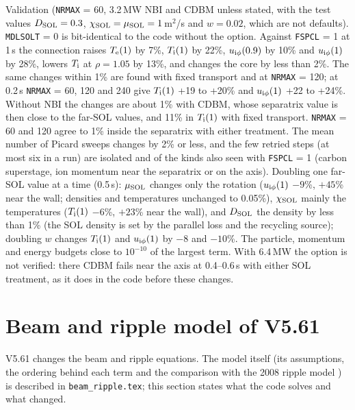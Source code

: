 \documentclass[11pt]{article}
\def\r#1{{\rm#1}}
\begin{document}
Validation (\texttt{NRMAX} = 60, 3.2\,MW NBI and CDBM unless stated, with the test values
$D_\r{SOL}=0.3$, $\chi_\r{SOL}=\mu_\r{SOL}=1$\,m$^2$/s and $w=0.02$, which are not defaults).
\texttt{MDLSOLT} = 0 is bit-identical to the code without the option.  Against
\texttt{FSPCL} = 1 at 1\,s the connection raises $T_\r{e}(1)$ by 7\%, $T_\r{i}(1)$ by 22\%,
$u_{\r{i}\phi}(0.9)$ by 10\% and $u_{\r{i}\phi}(1)$ by 28\%, lowers $T_\r{i}$ at $\rho=1.05$ by
13\%, and changes the core by less than 2\%.  The same changes within 1\% are found with fixed
transport and at \texttt{NRMAX} = 120; at 0.2\,s \texttt{NRMAX} = 60, 120 and 240 give $T_\r{i}(1)$
+19 to +20\% and $u_{\r{i}\phi}(1)$ +22 to +24\%.  Without NBI the changes are about 1\% with
CDBM, whose separatrix value is then close to the far-SOL values, and 11\% in $T_\r{i}(1)$ with
fixed transport.  \texttt{NRMAX} = 60 and 120 agree to 1\% inside the separatrix with either
treatment.  The mean number of Picard sweeps changes by 2\% or less, and the few retried steps
(at most six in a run) are isolated and of the kinds also seen with \texttt{FSPCL} = 1 (carbon
superstage, ion momentum near the separatrix or on the axis).  Doubling one
far-SOL value at a time (0.5\,s): $\mu_\r{SOL}$ changes only the rotation ($u_{\r{i}\phi}(1)$
$-9$\%, $+45$\% near the wall; densities and temperatures unchanged to 0.05\%), $\chi_\r{SOL}$
mainly the temperatures ($T_\r{i}(1)$ $-6$\%, $+23$\% near the wall), and $D_\r{SOL}$ the density
by less than 1\% (the SOL density is set by the parallel loss and the recycling source);
doubling $w$ changes $T_\r{i}(1)$ and $u_{\r{i}\phi}(1)$ by $-8$ and $-10$\%.  The particle,
momentum and energy budgets close to $10^{-10}$ of the largest term.  With 6.4\,MW the option is
not verified: there CDBM fails near the axis at 0.4--0.6\,s with either SOL treatment, as it
does in the code before these changes.


\section{Beam and ripple model of V5.61}
\setcounter{equation}{0}
\label{sec:v561}

V5.61 changes the beam and ripple equations.  The model itself (its
assumptions, the ordering behind each term and the comparison with the 2008
ripple model \cite{NF2008}) is described in \texttt{beam\_ripple.tex}; this
section states what the code solves and what changed.
\end{document}
